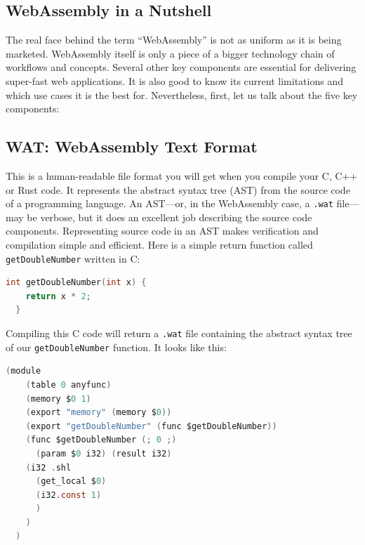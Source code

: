 \documentclass[10pt]{article}
\begin{document}
\begin{sloppypar}
  \subsection{WebAssembly in a Nutshell}
  \label{sec:wasm-in-a-nutshell}

  The real face behind the term “WebAssembly” is not as uniform as it is being marketed. WebAssembly itself is only a piece of a bigger technology chain of workflows and concepts. Several other key components are essential for delivering super-fast web applications. It is also good to know its current limitations and which use cases it is the best for. Nevertheless, first, let us talk about the five key components:

  \subsection{WAT: WebAssembly Text Format}
  \label{sec:webassembly-text-format}

  This is a human-readable file format you will get when you compile your C, C++ or Rust code. It represents the abstract syntax tree (AST) from the source code of a programming language. An AST—or, in the WebAssembly case, a \lstinline{.wat} file—may be verbose, but it does an excellent job describing the source code components. Representing source code in an AST makes verification and compilation simple and efficient. Here is a simple return function called \lstinline{getDoubleNumber} written in C:

  \vspace{7pt}
  \begin{lstlisting}[language=C, caption=Code example in C., label=lst:c-example]
  int getDoubleNumber(int x) {
    return x * 2;
  }\end{lstlisting}

  Compiling this C code will return a \lstinline{.wat} file containing the abstract syntax tree of our \lstinline{getDoubleNumber} function. It looks like this:

  \vspace{7pt}
  \begin{lstlisting}[language=C, caption=Code example from above compiled into the WebAssembly Text Format., label=lst:wat-example]
  (module
    (table 0 anyfunc)
    (memory $0 1)
    (export "memory" (memory $0))
    (export "getDoubleNumber" (func $getDoubleNumber))
    (func $getDoubleNumber (; 0 ;)
      (param $0 i32) (result i32)
    (i32 .shl
      (get_local $0)
      (i32.const 1)
      )
    )
  )\end{lstlisting}


\end{sloppypar}
\end{document}
